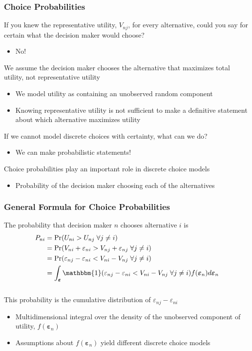 \documentclass{beamer}\usepackage[]{graphicx}\usepackage[]{xcolor}
\begin{document}
\begin{frame}\frametitle{Choice Probabilities}
  If you knew the representative utility, $V_{nj}$, for every alternative, could you say for certain what the decision maker would choose?
  \begin{itemize}
    \item No!
  \end{itemize}
  \vspace{2ex}
	We assume the decision maker chooses the alternative that maximizes total utility, not representative utility
	\begin{itemize}
	  \item We model utility as containing an unobserved random component
		\item Knowing representative utility is not sufficient to make a definitive statement about which alternative maximizes utility
	\end{itemize}
	\vspace{2ex}
	If we cannot model discrete choices with certainty, what can we do?
	\begin{itemize}
		\item We can make probabilistic statements!
	\end{itemize}
	\vspace{2ex}
	Choice probabilities play an important role in discrete choice models
	\begin{itemize}
		\item Probability of the decision maker choosing each of the alternatives
	\end{itemize}
\end{frame}

\begin{frame}\frametitle{General Formula for Choice Probabilities}
    The probability that decision maker $n$ chooses alternative $i$ is
    \begin{align*}
    	P_{ni} & = \Pr(U_{ni} > U_{nj} \; \forall j \neq i) \\
    	& = \Pr(V_{ni} + \varepsilon_{ni} > V_{nj} + \varepsilon_{nj} \; \forall j \neq i) \\
    	& = \Pr(\varepsilon_{nj} - \varepsilon_{ni} < V_{ni} - V_{nj} \; \forall j \neq i) \\
    	& = \int_{\bm{\varepsilon}} \mathbbm{1}(\varepsilon_{nj} - \varepsilon_{ni} < V_{ni} - V_{nj} \; \forall j \neq i) f(\bm{\varepsilon}_n) d\bm{\varepsilon}_n
    \end{align*} \\
    \vspace{2ex}
    This probability is the cumulative distribution of $\varepsilon_{nj} - \varepsilon_{ni}$
    \begin{itemize}
    	\item Multidimensional integral over the density of the unobserved component of utility, $f(\bm{\varepsilon}_n)$
    	\item Assumptions about $f(\bm{\varepsilon}_n)$ yield different discrete choice models
    \end{itemize}
\end{frame}
\end{document}
